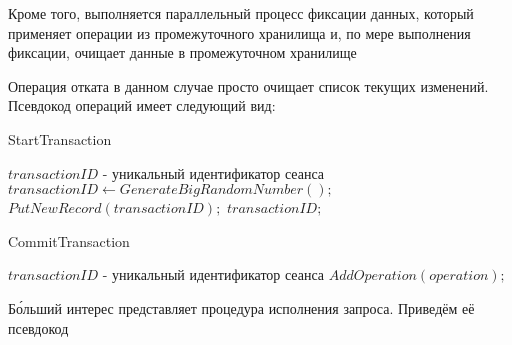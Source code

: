 \documentclass{matmex-diploma}
\begin{document}
        Кроме того, выполняется параллельный процесс фиксации данных, который применяет операции из промежуточного хранилища и, по мере выполнения фиксации, очищает данные в промежуточном хранилище
        
        
        Операция отката в данном случае просто очищает список текущих изменений. Псевдокод операций имеет следующий вид:
        
        \begin{algorithm}[H]                   
        \caption{StartTransaction}              
        \label{startTran12}                        
            \begin{algorithmic}        
                \ENSURE $transactionID$ - уникальный идентификатор сеанса
                \STATE $transactionID \leftarrow GenerateBigRandomNumber();$
                \STATE $PutNewRecord(transactionID);$
                \RETURN $transactionID;$
            \end{algorithmic}
        \end{algorithm}
        
        \begin{algorithm}[H]                   
        \caption{CommitTransaction}              
        \label{commitTran2}                        
            \begin{algorithmic}
                \REQUIRE $transactionID$ - уникальный идентификатор сеанса
                    \STATE $AddOperation(operation);$
                \ENDFOR
            \end{algorithmic}
        \end{algorithm}
        
        Б\'{о}льший интерес представляет процедура исполнения запроса. Приведём её псевдокод
        
\end{document}
